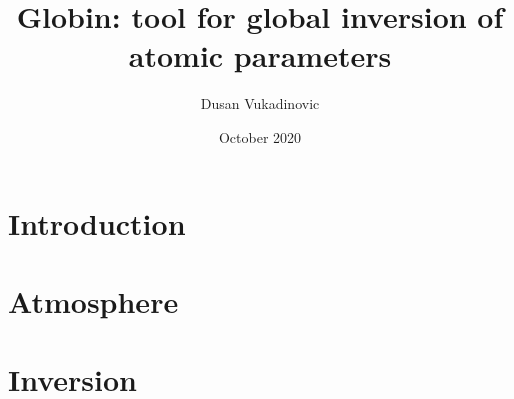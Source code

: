 \documentclass[12pt]{article}
\title{Globin: tool for global inversion of atomic parameters}
\author{Dusan Vukadinovic}
\date{October 2020}
\begin{document}
\maketitle

\section{Introduction}

\section{Atmosphere}

\section{Inversion}
\end{document}
